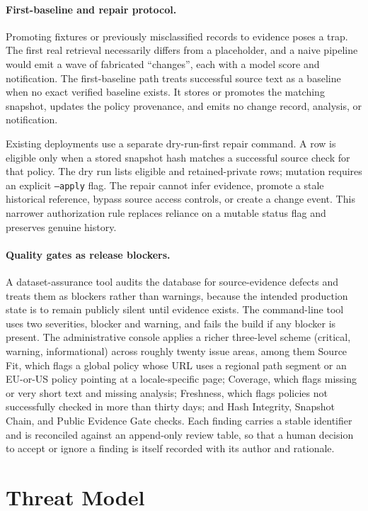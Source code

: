 \documentclass[11pt]{article}
\begin{document}
\paragraph{First-baseline and repair protocol.}
Promoting fixtures or previously misclassified records to evidence poses a trap.
The first real retrieval necessarily differs from a placeholder, and a naive
pipeline would emit a wave of fabricated ``changes'', each with a model score
and notification. The first-baseline path treats successful source text as a
baseline when no exact verified baseline exists. It stores or promotes the
matching snapshot, updates the policy provenance, and emits no change record,
analysis, or notification.

Existing deployments use a separate dry-run-first repair command. A row is
eligible only when a stored snapshot hash matches a successful source check for
that policy. The dry run lists eligible and retained-private rows; mutation
requires an explicit \texttt{--apply} flag. The repair cannot infer evidence,
promote a stale historical reference, bypass source access controls, or create a
change event. This narrower authorization rule replaces reliance on a mutable
status flag and preserves genuine history.

\paragraph{Quality gates as release blockers.}
A dataset-assurance tool audits the database for source-evidence defects and
treats them as blockers rather than warnings, because the intended production
state is to remain publicly silent until evidence exists. The command-line tool
uses two severities, blocker and warning, and fails the build if any blocker is
present. The administrative console applies a richer three-level scheme (critical,
warning, informational) across roughly twenty issue areas, among them Source Fit,
which flags a global policy whose URL uses a regional path segment or an
EU-or-US policy pointing at a locale-specific page; Coverage, which flags missing
or very short text and missing analysis; Freshness, which flags policies not
successfully checked in more than thirty days; and Hash Integrity, Snapshot
Chain, and Public Evidence Gate checks. Each finding carries a stable identifier
and is reconciled against an append-only review table, so that a human decision to
accept or ignore a finding is itself recorded with its author and rationale.

\section{Threat Model}
\label{sec:threat}
\end{document}
